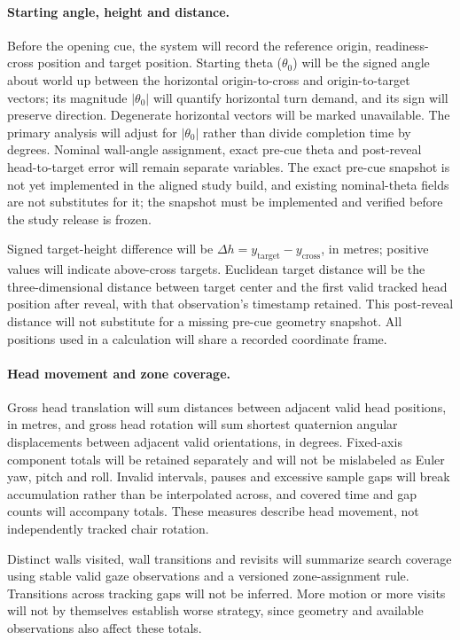 \paragraph{Starting angle, height and distance.} Before the opening cue, the system will record the reference origin, readiness-cross position and target position. Starting theta ($\theta_0$) will be the signed angle about world up between the horizontal origin-to-cross and origin-to-target vectors; its magnitude $|\theta_0|$ will quantify horizontal turn demand, and its sign will preserve direction. Degenerate horizontal vectors will be marked unavailable. The primary analysis will adjust for $|\theta_0|$ rather than divide completion time by degrees. Nominal wall-angle assignment, exact pre-cue theta and post-reveal head-to-target error will remain separate variables. The exact pre-cue snapshot is not yet implemented in the aligned study build, and existing nominal-theta fields are not substitutes for it; the snapshot must be implemented and verified before the study release is frozen.

Signed target-height difference will be $\Delta h=y_{\mathrm{target}}-y_{\mathrm{cross}}$, in metres; positive values will indicate above-cross targets. Euclidean target distance will be the three-dimensional distance between target center and the first valid tracked head position after reveal, with that observation's timestamp retained. This post-reveal distance will not substitute for a missing pre-cue geometry snapshot. All positions used in a calculation will share a recorded coordinate frame.

\paragraph{Head movement and zone coverage.} Gross head translation will sum distances between adjacent valid head positions, in metres, and gross head rotation will sum shortest quaternion angular displacements between adjacent valid orientations, in degrees. Fixed-axis component totals will be retained separately and will not be mislabeled as Euler yaw, pitch and roll. Invalid intervals, pauses and excessive sample gaps will break accumulation rather than be interpolated across, and covered time and gap counts will accompany totals. These measures describe head movement, not independently tracked chair rotation.

Distinct walls visited, wall transitions and revisits will summarize search coverage using stable valid gaze observations and a versioned zone-assignment rule. Transitions across tracking gaps will not be inferred. More motion or more visits will not by themselves establish worse strategy, since geometry and available observations also affect these totals.

